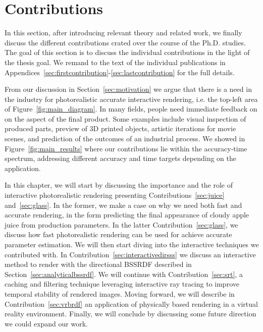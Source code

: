 \chapter{Contributions}
\label{sec:contributions}
In this section, after introducing relevant theory and related work, we finally discuss the different contributions crated over the course of the Ph.D. studies. The goal of this section is to discuss the individual contributions in the light of the thesis goal. We remand to the text of the individual publications in Appendices~\ref{sec:firstcontribution}-\ref{sec:lastcontribution} for the full details.

From our discussion in Section~\ref{sec:motivation} we argue that there is a need in the industry for photorealistic accurate interactive rendering, i.e. the top-left area of Figure~\ref{fig:main_diagram}. In many fields, people need immediate feedback on on the aspect of the final product. Some examples include visual inspection of produced parts, preview of 3D printed objects, artistic iterations for movie scenes, and prediction of the outcomes of an industrial process. We showed in Figure~\ref{fig:main_results} where our contributions lie within the accuracy-time spectrum, addressing different accuracy and time targets depending on the application.

In this chapter, we will start by discussing the importance and the role of interactive photorealistic rendering presenting Contributions~\ref{sec:juice} and~\ref{sec:glass}. In the former, we make a case on why we need both fast and accurate rendering, in the form predicting the final appearance of cloudy apple juice from production parameters. In the latter Contribution~\ref{sec:glass}, we discuss how fast photorealistic rendering can be used for achieve accurate parameter estimation. We will then start diving into the interactive techniques we contributed with. In Contribution~\ref{sec:interactivedirsss} we discuss an interactive method to render with the directional BSSRDF described in Section~\ref{sec:analyticalbssrdf}. We will continue with Contribution~\ref{sec:srt}, a caching and filtering technique leveraging interactive ray tracing to improve temporal stability of rendered images. Moving forward, we will describe in Contribution~\ref{sec:vrbrdf} an application of physically based rendering in a virtual reality environment. Finally, we will conclude by discussing some future direction we could expand our work.

